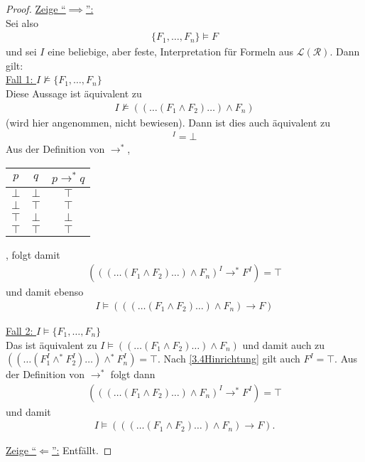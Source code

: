 \documentclass[12pt,a4paper]{article}
\begin{document}
\begin{proof}
\underline{Zeige ``$\implies$'':}\\
Sei also 
\begin{align}\label{3.4Hinrichtung}
\lbrace F_1,\ldots, F_n\rbrace\models F
\end{align}
und sei $I$ eine beliebige, aber feste, Interpretation für Formeln aus $\mathcal{L}(\mathcal{R})$. Dann gilt:\\

\underline{Fall 1: $I\not\models\lbrace F_1,\ldots,F_n\rbrace$}\\
Diese Aussage ist äquivalent zu
\begin{align*}
I\not\models((\ldots(F_1\wedge F_2)\ldots)\wedge F_n)
\end{align*}
(wird hier angenommen, nicht bewiesen). Dann ist dies auch äquivalent zu 
\begin{align*}
[((\ldots(F_1\wedge F_2)\ldots)\wedge F_n)]^I=\bot
\end{align*}
Aus der Definition von $\to^\ast$,\\
\begin{tabular}{c|c||c}
$p$ & $q$ & $p\to^\ast q$\\ \hline
$\bot$ & $\bot$ & $\top$\\
$\bot$ & $\top$ & $\top$\\
$\top$ & $\bot$ & $\bot$\\
$\top$ & $\top$ & $\top$
\end{tabular}, 
folgt damit
\begin{align*}
(((\ldots(F_1\wedge F_2)\ldots)\wedge F_n)^I\to^\ast F^I)=\top
\end{align*}
und damit ebenso
\begin{align*}
I\models(((\ldots(F_1\wedge F_2)\ldots)\wedge F_n)\to F)
\end{align*}

\underline{Fall 2: $I\models\lbrace F_1,\ldots,F_n\rbrace$}\\
Das ist äquivalent zu $I\models((\ldots(F_1\wedge F_2)\ldots)\wedge F_n)$ und damit auch zu $((\ldots (F_1^I\wedge^\ast F_2^I)\ldots)\wedge^\ast F_n^I)=\top$. Nach \eqref{3.4Hinrichtung} gilt auch $F^I=\top$. Aus der Definition von $\to^\ast$ folgt dann 
\begin{align*}
(((\ldots(F_1\wedge F_2)\ldots)\wedge F_n)^I\to^\ast F^I)=\top
\end{align*}
und damit
\begin{align*}
I\models(((\ldots(F_1\wedge F_2)\ldots)\wedge F_n)\to F).
\end{align*}

\underline{Zeige ``$\Longleftarrow$'':} Entfällt.
\end{proof}
\end{document}
